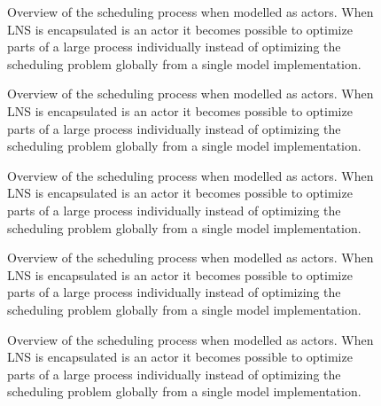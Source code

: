 % 	
\begin{figure}[H]
	\centering
	
	\drawModelSetupHexagon[persistence=true]
	\caption{
		Overview of the scheduling process when modelled as actors. When LNS is encapsulated 
		is an actor it becomes possible to optimize parts of a large process individually instead of 
		optimizing the scheduling problem globally from a single model implementation.
	}
	\label{fig:ordinator-hexagon:persistence}
\end{figure}
\begin{figure}[H]
	\centering
	
	\drawModelSetupHexagon[atomicpointerswap=true]
	\caption{
		Overview of the scheduling process when modelled as actors. When LNS is encapsulated 
		is an actor it becomes possible to optimize parts of a large process individually instead of 
		optimizing the scheduling problem globally from a single model implementation.
	}
	\label{fig:ordinator-hexagon:atomicpointerswap}
\end{figure}

\begin{figure}[H]
	\centering
	
	\drawModelSetupHexagon[metaheuristics=true]
	\caption{
		Overview of the scheduling process when modelled as actors. When LNS is encapsulated 
		is an actor it becomes possible to optimize parts of a large process individually instead of 
		optimizing the scheduling problem globally from a single model implementation.
	}
	\label{fig:ordinator-hexagon:metaheuristics}
\end{figure}

\begin{figure}[H]
	\centering
	
	\drawModelSetupHexagon[orchestrator=true]
	\caption{
		Overview of the scheduling process when modelled as actors. When LNS is encapsulated 
		is an actor it becomes possible to optimize parts of a large process individually instead of 
		optimizing the scheduling problem globally from a single model implementation.
	}
	\label{fig:ordinator-hexagon:orchestrator}
\end{figure}
\begin{figure}[H]
	\centering
	
	\drawModelSetupHexagon[userinterface=true]
	\caption{
		Overview of the scheduling process when modelled as actors. When LNS is encapsulated 
		is an actor it becomes possible to optimize parts of a large process individually instead of 
		optimizing the scheduling problem globally from a single model implementation.
	}
	\label{fig:ordinator-hexagon:userinterfaces}
\end{figure}

